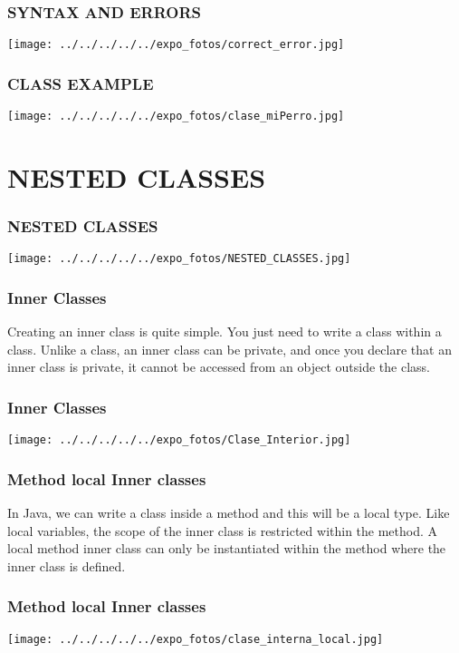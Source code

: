 \documentclass[11pt,a4paper]{beamer}
\begin{document}
\begin{frame}
\frametitle{SYNTAX AND ERRORS}
\begin{center}
\texttt{[image: ../../../../../expo\_fotos/correct\_error.jpg]} 
\end{center}
\end{frame}

\begin{frame}
\frametitle{CLASS EXAMPLE}
\begin{center}
\texttt{[image: ../../../../../expo\_fotos/clase\_miPerro.jpg]} 
\end{center}
\end{frame}

\section{NESTED CLASSES}
\begin{frame}
\frametitle{NESTED CLASSES}
\begin{center}
\texttt{[image: ../../../../../expo\_fotos/NESTED\_CLASSES.jpg]}
\end{center}
\end{frame}


\begin{frame}
\frametitle{Inner Classes}
Creating an inner class is quite simple. You just need to write a class within a class. Unlike a class, an inner class can be private, and once you declare that an inner class is private, it cannot be accessed from an object outside the class.
\end{frame}

\begin{frame}
\frametitle{Inner Classes}
\begin{center}
\texttt{[image: ../../../../../expo\_fotos/Clase\_Interior.jpg]} 
\end{center}
\end{frame}

\begin{frame}
\frametitle{Method local Inner classes}
In Java, we can write a class inside a method and this will be a local type. Like local variables, the scope of the inner class is restricted within the method.
A local method inner class can only be instantiated within the method where the inner class is defined.
\end{frame}

\begin{frame}
\frametitle{Method local Inner classes}
\begin{center}
\texttt{[image: ../../../../../expo\_fotos/clase\_interna\_local.jpg]} 
\end{center}
\end{frame}
\end{document}
